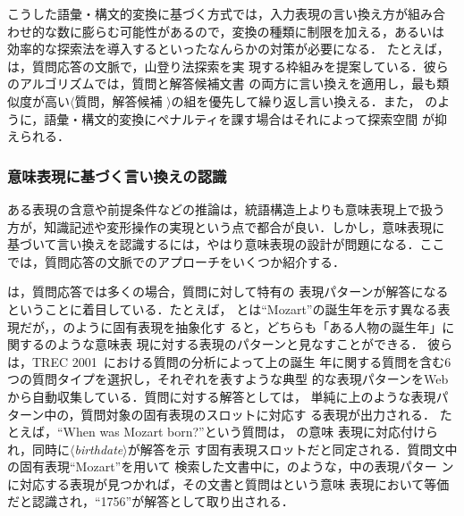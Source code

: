 こうした語彙・構文的変換に基づく方式では，入力表現の言い換え方が組み合
わせ的な数に膨らむ可能性があるので，変換の種類に制限を加える，あるいは
効率的な探索法を導入するといったなんらかの対策が必要になる．
たとえば，は，質問応答の文脈で，山登り法探索を実
現する枠組みを提案している．彼らのアルゴリズムでは，質問と解答候補文書
の両方に言い換えを適用し，最も類似度が高い$\langle$質問，解答候補
$\rangle$の組を優先して繰り返し言い換える．また，\citeauthor{ueda:00}
のように，語彙・構文的変換にペナルティを課す場合はそれによって探索空間
が抑えられる．

\subsubsection{意味表現に基づく言い換えの認識}

ある表現の含意や前提条件などの推論は，統語構造上よりも意味表現上で扱う
方が，知識記述や変形操作の実現という点で都合が良い．しかし，意味表現に
基づいて言い換えを認識するには，やはり意味表現の設計が問題になる．ここ
では，質問応答の文脈でのアプローチをいくつか紹介する．

は，質問応答では多くの場合，質問に対して特有の
表現パターンが解答になるということに着目している．たとえば，
とは``Mozart''の誕生年を示す異なる表
現だが，，のように固有表現を抽象化す
ると，どちらも「ある人物の誕生年」に関するのような意味表
現に対する表現のパターンと見なすことができる．
彼らは，TREC 2001~\cite{voorhees:01}における質問の分析によって上の誕生
年に関する質問を含む6つの質問タイプを選択し，それぞれを表すような典型
的な表現パターンをWebから自動収集している．質問に対する解答としては，
単純に上のような表現パターン中の，質問対象の固有表現のスロットに対応す
る表現が出力される．
たとえば，``When was Mozart born?''という質問は， の意味
表現に対応付けられ，同時に$\langle$\emph{birthdate}$\rangle$が解答を示
す固有表現スロットだと同定される．質問文中の固有表現``Mozart''を用いて
検索した文書中に，のような，中の表現パター
ンに対応する表現が見つかれば，その文書と質問はという意味
表現において等価だと認識され，``1756''が解答として取り出される．

